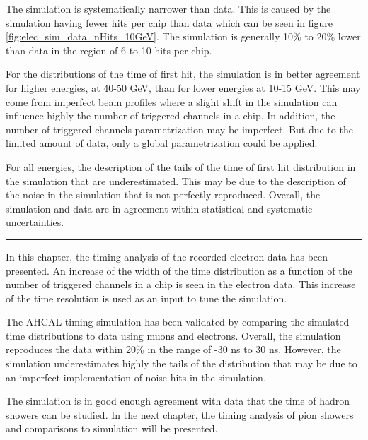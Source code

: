 The simulation is systematically narrower than data. This is caused by the simulation having fewer hits per chip than data which can be seen in figure \ref{fig:elec_sim_data_nHits_10GeV}. The simulation is generally 10\% to 20\% lower than data in the region of 6 to 10 hits per chip.

For the distributions of the time of first hit, the simulation is in better agreement for higher energies, at 40-50 GeV, than for lower energies at 10-15 GeV. This may come from imperfect beam profiles where a slight shift in the simulation can influence highly the number of triggered channels in a chip. In addition, the number of triggered channels parametrization may be imperfect. But due to the limited amount of data, only a global parametrization could be applied.

For all energies, the description of the tails of the time of first hit distribution in the simulation that are underestimated. This may be due to the description of the noise in the simulation that is not perfectly reproduced. Overall, the simulation and data are in agreement within statistical and systematic uncertainties.

\begin{center}
  \rule{0.5\textwidth}{.4pt}
\end{center}

In this chapter, the timing analysis of the recorded electron data has been presented. An increase of the width of the time distribution as a function of the number of triggered channels in a chip is seen in the electron data. This increase of the time resolution is used as an input to tune the simulation.

The AHCAL timing simulation has been validated by comparing the simulated time distributions to data using muons and electrons. Overall, the simulation reproduces the data within 20\% in the range of -30 ns to 30 ns. However, the simulation underestimates highly the tails of the distribution that may be due to an imperfect implementation of noise hits in the simulation.

The simulation is in good enough agreement with data that the time of hadron showers can be studied. In the next chapter, the timing analysis of pion showers and comparisons to simulation will be presented.
